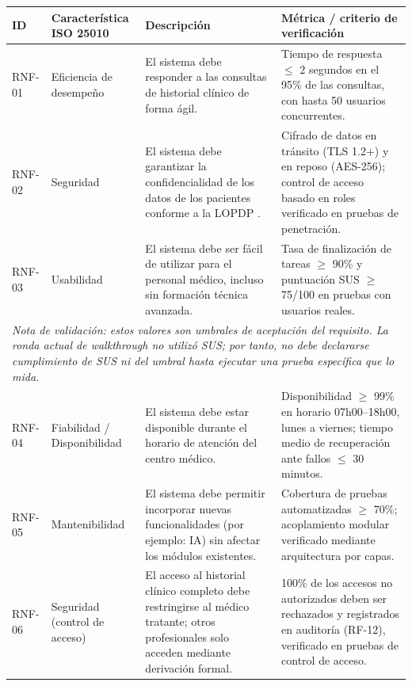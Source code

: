 \documentclass[11pt,a4paper]{article}
\begin{document}
	
	\begin{longtable}{
			p{}
			p{}
			p{}
			p{}
		}
		
		\toprule
		\textbf{ID} &
		\textbf{Característica ISO 25010} &
		\textbf{Descripción} &
		\textbf{Métrica / criterio de verificación} \\
		\midrule
		\endhead
		
		RNF-01 &
		Eficiencia de desempeño &
		El sistema debe responder a las consultas de historial clínico de forma ágil. &
		Tiempo de respuesta \(\leq\) 2 segundos en el 95\% de las consultas, con hasta 50 usuarios concurrentes. \\
		
		RNF-02 &
		Seguridad &
		El sistema debe garantizar la confidencialidad de los datos de los pacientes conforme a la LOPDP \cite{loppd}. &
		Cifrado de datos en tránsito (TLS 1.2+) y en reposo (AES-256); control de acceso basado en roles verificado en pruebas de penetración. \\
		
		RNF-03 &
		Usabilidad &
		El sistema debe ser fácil de utilizar para el personal médico, incluso sin formación técnica avanzada. &
		Tasa de finalización de tareas \(\geq\) 90\% y puntuación SUS \(\geq\) 75/100 en pruebas con usuarios reales. \\
		\multicolumn{4}{p{0.92\textwidth}}{\footnotesize\textit{Nota de validación: estos valores son umbrales de aceptación del requisito. La ronda actual de walkthrough no utilizó SUS; por tanto, no debe declararse cumplimiento de SUS ni del umbral hasta ejecutar una prueba específica que lo mida.}} \\
		
		
		RNF-04 &
		Fiabilidad / Disponibilidad &
		El sistema debe estar disponible durante el horario de atención del centro médico. &
		Disponibilidad \(\geq\) 99\% en horario 07h00--18h00, lunes a viernes; tiempo medio de recuperación ante fallos \(\leq\) 30 minutos. \\
		
		RNF-05 &
		Mantenibilidad &
		El sistema debe permitir incorporar nuevas funcionalidades (por ejemplo: IA) sin afectar los módulos existentes. &
		Cobertura de pruebas automatizadas \(\geq\) 70\%; acoplamiento modular verificado mediante arquitectura por capas. \\
		
		RNF-06 &
		Seguridad (control de acceso) &
		El acceso al historial clínico completo debe restringirse al médico tratante; otros profesionales solo acceden mediante derivación formal. &
		100\% de los accesos no autorizados deben ser rechazados y registrados en auditoría (RF-12), verificado en pruebas de control de acceso. \\
		

\end{longtable}
\end{document}
